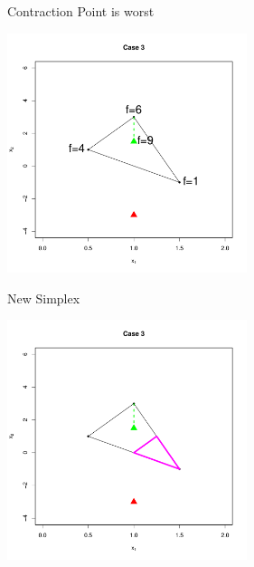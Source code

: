 \documentclass[10pt]{beamer}
\begin{document}
\begin{frame}{Contraction Point is worst}
  \begin{center}
    \includegraphics[height=7cm]{RCode/nmshrink1.pdf}
  \end{center}
\end{frame}
\begin{frame}{New Simplex}
  \begin{center}
    \includegraphics[height=7cm]{RCode/nmshrink2.pdf}
  \end{center}
\end{frame}
\end{document}
